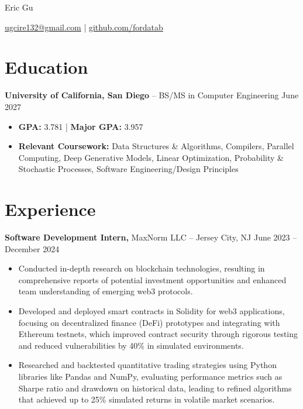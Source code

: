\documentclass[11pt]{article}       %
\begin{document}
\centerline{\Huge Eric Gu}

\vspace{-4pt}

\centerline{\href{mailto:ugcire132@gmail.com}{ugcire132@gmail.com} |  \href{github.com/fordatab}{github.com/fordatab}}

\vspace{-18.5pt}

\section*{Education}
\textbf{University of California, San Diego} -- BS/MS in Computer Engineering  \hfill June 2027\begin{itemize}[leftmargin=*, nosep]
    \item \textbf{GPA:} 3.781 | \textbf{Major GPA:} 3.957
    \item \textbf{Relevant Coursework:} Data Structures \& Algorithms, Compilers, Parallel Computing, Deep Generative Models, Linear Optimization, Probability \& Stochastic Processes, Software Engineering/Design Principles
\end{itemize}


\vspace{-18.5pt}

\section*{Experience}
\textbf{Software Development Intern,} {MaxNorm LLC} -- Jersey City, NJ \hfill June 2023 -- December 2024 \
\vspace{-9pt}
\begin{itemize}
\item Conducted in-depth research on blockchain technologies, resulting in comprehensive reports of potential investment opportunities and enhanced team understanding of emerging web3 protocols.
\item Developed and deployed smart contracts in Solidity for web3 applications, focusing on decentralized finance (DeFi) prototypes and integrating with Ethereum testnets, which improved contract security through rigorous testing and reduced vulnerabilities by 40\% in simulated environments.
\item Researched and backtested quantitative trading strategies using Python libraries like Pandas and NumPy, evaluating performance metrics such as Sharpe ratio and drawdown on historical data, leading to refined algorithms that achieved up to 25\% simulated returns in volatile market scenarios.
\end{itemize}
\end{document}
